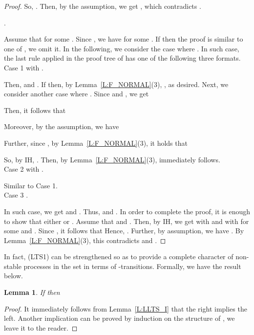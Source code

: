 \documentclass{elsarticle}
\theoremstyle{plain}
\newtheorem{lemma}[theorem]{Lemma}
\theoremstyle{definition}
\begin{document}
\begin{proof}
        So, . Then, by the assumption, we get , which contradicts .

  \noindent  .

        Assume that  for some .
        Since , we have  for some .
         If  then the proof is similar to one of , we omit it.
         In the following, we consider the case where . In such case, the last rule applied in the proof tree of  has one of the following three formats.\\

        \noindent Case 1  with .

        Then,  and .
        If  then, by Lemma~\ref{L:F_NORMAL}(3), , as desired.
        Next, we consider another case where .
        Since  and , we get
        
        Then, it follows that
        
        Moreover, by the assumption, we have
         
         Further, since , by Lemma~\ref{L:F_NORMAL}(3), it holds that
         
         So, by IH, .
         Then, by Lemma~\ref{L:F_NORMAL}(3),  immediately follows.\\


       \noindent Case 2  with .

        Similar to Case 1.\\

       \noindent Case 3 .

        In such case, we get  and . Thus,  and . In order to complete the proof, it is enough to show that either  or .
        Assume that  and .
        Then, by IH, we get  with  and  with  for some  and .
        Since , it follows that 
         Hence, .
         Further, by assumption, we have .
         By Lemma~\ref{L:F_NORMAL}(3), this contradicts  and .
\end{proof}

In fact, (LTS1) can be strengthened so as to provide a complete character of non-stable processes in the set  in terms of -transitions.
Formally, we have the result below.

\begin{lemma}\label{L:F_TAU_I}
 If  then
  
\end{lemma}
\begin{proof}
It immediately follows from Lemma~\ref{L:LLTS_I} that the right implies the left.
Another implication can be proved by induction on the structure of , we leave it to the reader.
\end{proof}
\end{document}
